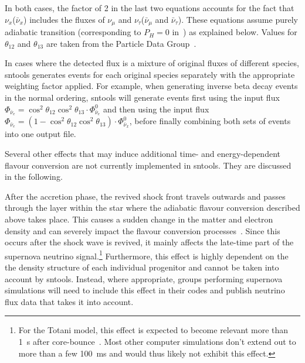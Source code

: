 \documentclass[11pt, oneside]{article}
\newcommand{\numu}{\ensuremath{\nu_\mu}\xspace}
\newcommand{\nutau}{\ensuremath{\nu_\tau}\xspace}
\newcommand{\nux}{\ensuremath{\nu_x}\xspace}
\newcommand{\nuebar}{\ensuremath{\bar{\nu}_e}\xspace}
\newcommand{\numubar}{\ensuremath{\bar{\nu}_\mu}\xspace}
\newcommand{\nutaubar}{\ensuremath{\bar{\nu}_\tau}\xspace}
\newcommand{\nuxbar}{\ensuremath{\bar{\nu}_x}\xspace}
\begin{document}
In both cases, the factor of 2 in the last two equations accounts for the fact that \nux (\nuxbar) includes the fluxes of \numu and \nutau (\numubar and \nutaubar).
These equations assume purely adiabatic transition (corresponding to $P_H = 0$ in~\cite{Dighe2000,Fogli2005}) as explained below.
Values for $\theta_{12}$ and $\theta_{13}$ are taken from the Particle Data Group~\cite{PDG2020}.

In cases where the detected flux is a mixture of original fluxes of different species, sntools generates events for each original species separately with the appropriate weighting factor applied.
For example, when generating inverse beta decay events in the normal ordering, sntools will generate events first using the input flux $\Phi_{\nuebar} = \cos^2 \theta_{12} \cos^2 \theta_{13} \cdot \Phi^0_{\nuebar}$ and then using the input flux $\Phi_{\nuebar} = (1 - \cos^2 \theta_{12} \cos^2 \theta_{13}) \cdot \Phi^0_{\nuxbar}$, before finally combining both sets of events into one output file.

Several other effects that may induce additional time- and energy-dependent flavour conversion are not currently implemented in sntools.
They are discussed in the following.

After the accretion phase, the revived shock front travels outwards and passes through the layer within the star where the adiabatic flavour conversion described above takes place.
This causes a sudden change in the matter and electron density and can severely impact the flavour conversion processes~\cite{Schirato2002}.
Since this occurs after the shock wave is revived, it mainly affects the late-time part of the supernova neutrino signal.\footnote{For the Totani model, this effect is expected to become relevant more than \SI{1}{s} after core-bounce~\cite{Fogli2005}. Most other computer simulations don’t extend out to more than a few \SI{100}{ms} and would thus likely not exhibit this effect.}
Furthermore, this effect is highly dependent on the the density structure of each individual progenitor and cannot be taken into account by sntools.
Instead, where appropriate, groups performing supernova simulations will need to include this effect in their codes and publish neutrino flux data that takes it into account.
\end{document}
